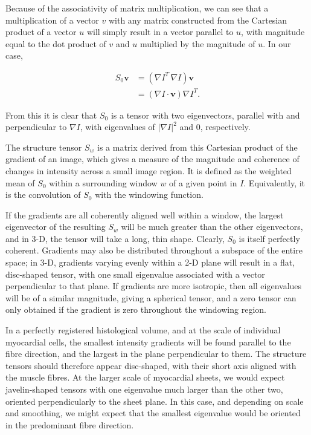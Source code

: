     Because of the associativity of matrix multiplication, we can see that a multiplication of a vector $v$ with any matrix constructed from the Cartesian product of a vector $u$ will simply result in a vector parallel to $u$, with magnitude equal to the dot product of $v$ and $u$ multiplied by the magnitude of $u$. In our case,
  
    \begin{align}
      S_0 \mathbf{v} &= (\nabla I^T \, \nabla I) \mathbf{v} \\
                     &= (\nabla I \cdot \mathbf{v}) \nabla I^T.
    \end{align}
  
    From this it is clear that $S_0$ is a tensor with two eigenvectors, parallel with and perpendicular to $\nabla I$, with eigenvalues of $|\nabla I|^2$ and 0, respectively.
  
    The structure tensor $S_w$ is a matrix derived from this Cartesian product of the gradient of an image, which gives a measure of the magnitude and coherence of changes in intensity across a small image region. It is defined as the weighted mean of $S_0$ within a surrounding window $w$ of a given point in $I$. Equivalently, it is the convolution of $S_0$ with the windowing function.
  
    If the gradients are all coherently aligned well within a window, the largest eigenvector of the resulting $S_w$ will be much greater than the other eigenvectors, and in 3-D, the tensor will take a long, thin shape. Clearly, $S_0$ is itself perfectly coherent. Gradients may also be distributed throughout a subspace of the entire space; in 3-D, gradients varying evenly within a 2-D plane will result in a flat, disc-shaped tensor, with one small eigenvalue associated with a vector perpendicular to that plane. If gradients are more isotropic, then all eigenvalues will be of a similar magnitude, giving a spherical tensor, and a zero tensor can only obtained if the gradient is zero throughout the windowing region.
  
    In a perfectly registered histological volume, and at the scale of individual myocardial cells, the smallest intensity gradients will be found parallel to the fibre direction, and the largest in the plane perpendicular to them. The structure tensors should therefore appear disc-shaped, with their short axis aligned with the muscle fibres. At the larger scale of myocardial sheets, we would expect javelin-shaped tensors with one eigenvalue much larger than the other two, oriented perpendicularly to the sheet plane. In this case, and depending on scale and smoothing, we might expect that the smallest eigenvalue would be oriented in the predominant fibre direction.
